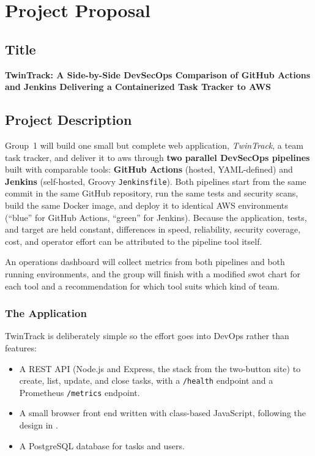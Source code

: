 \chapter{Project Proposal}

\section{Title}
\begin{center}
\large\textbf{TwinTrack: A Side-by-Side DevSecOps Comparison of GitHub Actions
and Jenkins Delivering a Containerized Task Tracker to AWS}
\end{center}

\section{Project Description}
Group~1 will build one small but complete web application, \emph{TwinTrack},
a team task tracker, and deliver it to \gls{aws} through \textbf{two parallel
DevSecOps pipelines} built with comparable tools: \textbf{GitHub Actions}
(hosted, YAML-defined) and \textbf{Jenkins} (self-hosted, Groovy
\texttt{Jenkinsfile}). Both pipelines start from the same commit in the same
GitHub repository, run the same tests and security scans, build the same Docker
image, and deploy it to identical AWS environments (``blue'' for GitHub Actions,
``green'' for Jenkins). Because the application, tests, and target are held
constant, differences in speed, reliability, security coverage, cost, and
operator effort can be attributed to the pipeline tool itself.

An operations dashboard will collect metrics from both pipelines and both
running environments, and the group will finish with a modified \gls{swot}
chart for each tool and a recommendation for which tool suits which kind of
team.

\subsection{The Application}
TwinTrack is deliberately simple so the effort goes into DevOps rather than
features:
\begin{itemize}
\item A REST API (Node.js and Express, the stack from the two-button site) to
create, list, update, and close tasks, with a \texttt{/health} endpoint and a
Prometheus \texttt{/metrics} endpoint.
\item A small browser front end written with class-based JavaScript, following
the design in .
\item A PostgreSQL database for tasks and users.
\end{itemize}

